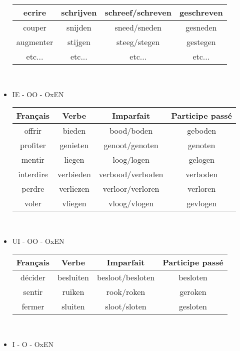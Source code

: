 \documentclass[a4paper]{article}
\begin{document}
\begin{itemize}[label=\textbullet, font=\Large]
\begin{center}
\begin{tabular}{|c|c|c|c|}
      \hline
      ecrire & schrijven & schreef/schreven & geschreven\\
      \hline
      couper & snijden & sneed/sneden & gesneden\\
      \hline
      augmenter & stijgen & steeg/stegen & gestegen\\
      \hline
      etc... & etc... & etc... & etc...\\
      \hline
    \end{tabular}\\
  \end{center}
  \item IE - OO - OxEN
  \begin{center}
    \begin{tabular}{|c|c|c|c|}
      \hline
      \textbf{Français} & \textbf{Verbe} & \textbf{Imparfait} & \textbf{Participe passé}\\
      \hline
      offrir & bieden & bood/boden & geboden\\
      \hline
      profiter & genieten & genoot/genoten & genoten\\
      \hline
      mentir & liegen & loog/logen & gelogen\\
      \hline
      interdire & verbieden & verbood/verboden & verboden\\
      \hline
      perdre & verliezen & verloor/verloren & verloren\\
      \hline
      voler & vliegen & vloog/vlogen & gevlogen\\
      \hline
    \end{tabular}\\
  \end{center}
  \item UI - OO - OxEN
  \begin{center}
    \begin{tabular}{|c|c|c|c|}
      \hline
      \textbf{Français} & \textbf{Verbe} & \textbf{Imparfait} & \textbf{Participe passé}\\
      \hline
      décider & besluiten & besloot/besloten & besloten\\
      \hline
      sentir & ruiken & rook/roken & geroken\\
      \hline
      fermer & sluiten & sloot/sloten & gesloten\\
      \hline
    \end{tabular}\\
  \end{center}
  \item I - O - OxEN

\end{itemize}
\end{document}
